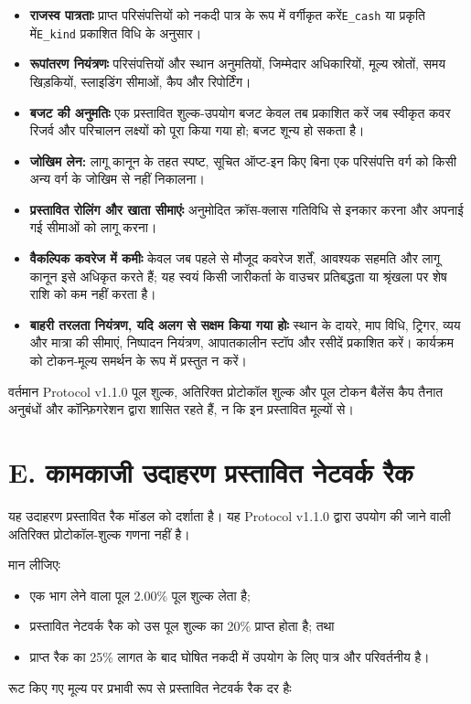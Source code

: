 \documentclass[11pt]{article}
\begin{document}
\begin{itemize}[leftmargin=*]
\item \textbf{राजस्व पात्रताः} प्राप्त परिसंपत्तियों को नकदी पात्र के रूप में वर्गीकृत करें\texttt{E\_cash} या प्रकृति में\texttt{E\_kind} प्रकाशित विधि के अनुसार।
\item \textbf{रूपांतरण नियंत्रणः} परिसंपत्तियों और स्थान अनुमतियों, जिम्मेदार अधिकारियों, मूल्य स्रोतों, समय खिड़कियों, स्लाइडिंग सीमाओं, कैप और रिपोर्टिंग।
\item \textbf{बजट की अनुमतिः} एक प्रस्तावित शुल्क-उपयोग बजट केवल तब प्रकाशित करें जब स्वीकृत कवर रिजर्व और परिचालन लक्ष्यों को पूरा किया गया हो; बजट शून्य हो सकता है।
\item \textbf{जोखिम लेन:} लागू कानून के तहत स्पष्ट, सूचित ऑप्ट-इन किए बिना एक परिसंपत्ति वर्ग को किसी अन्य वर्ग के जोखिम से नहीं निकालना।
\item \textbf{प्रस्तावित रोलिंग और खाता सीमाएंः} अनुमोदित क्रॉस-क्लास गतिविधि से इनकार करना और अपनाई गई सीमाओं को लागू करना।
\item \textbf{वैकल्पिक कवरेज में कमीः} केवल जब पहले से मौजूद कवरेज शर्तें, आवश्यक सहमति और लागू कानून इसे अधिकृत करते हैं; यह स्वयं किसी जारीकर्ता के वाउचर प्रतिबद्धता या श्रृंखला पर शेष राशि को कम नहीं करता है।
\item \textbf{बाहरी तरलता नियंत्रण, यदि अलग से सक्षम किया गया होः} स्थान के दायरे, माप विधि, ट्रिगर, व्यय और मात्रा की सीमाएं, निष्पादन नियंत्रण, आपातकालीन स्टॉप और रसीदें प्रकाशित करें। कार्यक्रम को टोकन-मूल्य समर्थन के रूप में प्रस्तुत न करें।
\end{itemize}
वर्तमान Protocol v1.1.0 पूल शुल्क, अतिरिक्त प्रोटोकॉल शुल्क और पूल टोकन बैलेंस कैप तैनात अनुबंधों और कॉन्फ़िगरेशन द्वारा शासित रहते हैं, न कि इन प्रस्तावित मूल्यों से।


\section*{E. कामकाजी उदाहरण  प्रस्तावित नेटवर्क रैक}

यह उदाहरण प्रस्तावित रैक मॉडल को दर्शाता है। यह Protocol v1.1.0 द्वारा उपयोग की जाने वाली अतिरिक्त प्रोटोकॉल-शुल्क गणना नहीं है।

मान लीजिएः

\begin{itemize}[leftmargin=*]
\item एक भाग लेने वाला पूल 2.00\% पूल शुल्क लेता है;
\item प्रस्तावित नेटवर्क रैक को उस पूल शुल्क का 20\% प्राप्त होता है; तथा
\item प्राप्त रैक का 25\% लागत के बाद घोषित नकदी में उपयोग के लिए पात्र और परिवर्तनीय है।
\end{itemize}
रूट किए गए मूल्य पर प्रभावी रूप से प्रस्तावित नेटवर्क रैक दर हैः
\end{document}
